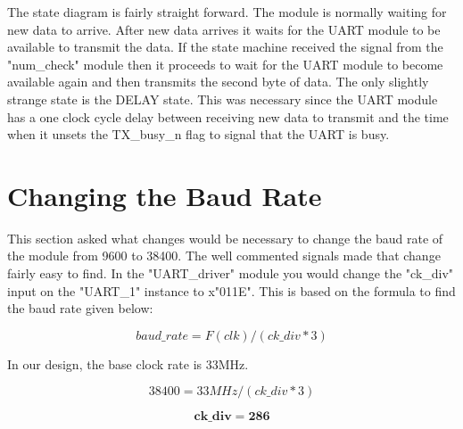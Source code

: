 \documentclass{article}
\begin{document}
The state diagram is fairly straight forward. The module is normally waiting for new data to arrive. After new data arrives it waits for the UART module to be available to transmit the data. If the state machine received the signal from the "num\_check" module then it proceeds to wait for the UART module to become available again and then transmits the second byte of data. The only slightly strange state is the DELAY state. This was necessary since the UART module has a one clock cycle delay between receiving new data to transmit and the time when it unsets the TX\_busy\_n flag to signal that the UART is busy. 


\section{Changing the Baud Rate}
This section asked what changes would be necessary to change the baud rate of the module from 9600 to 38400. The well commented signals made that change fairly easy to find. In the "UART\_driver" module you would change the "ck\_div" input on the "UART\_1" instance to x"011E". This is based on the formula to find the baud rate given below:

	\begin{displaymath}
		baud\_rate = F(clk) / (ck\_div*3)
	\end{displaymath}

In our design, the base clock rate is 33MHz.

	\begin{displaymath}
		38400 = 33MHz / (ck\_div*3)
	\end{displaymath}
	
	\begin{displaymath}
		\boldsymbol{ck\_div = 286}
	\end{displaymath}







\end{document}
